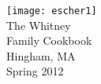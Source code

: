 \documentclass{book}
\begin{document}
\begin{center}
\vspace*{\fill}
\thispagestyle{empty}
\texttt{[image: escher1]}\\[1cm]
\Huge{The Whitney\\ Family Cookbook}\\ \vspace{0.5cm}
\LARGE{Hingham, MA}\\ \vspace{0.25cm}\Huge{Spring 2012}
\vspace*{\fill}
\end{center}
\newpage
\tableofcontents

\end{document}

